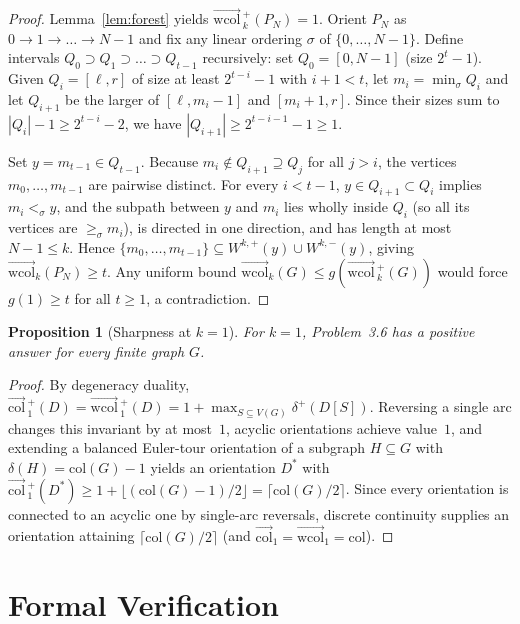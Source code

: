 \documentclass[11pt]{article}
\newtheorem{proposition}[theorem]{Proposition}
\newcommand{\wcol}{\overrightarrow{\mathrm{wcol}}}
\newcommand{\dcol}{\overrightarrow{\mathrm{col}}}
\newcommand{\wcolp}{\overrightarrow{\mathrm{wcol}}\,^{+}}
\newcommand{\dcolp}{\overrightarrow{\mathrm{col}}\,^{+}}
\begin{document}
\begin{proof}
Lemma~\ref{lem:forest} yields $\wcolp_k(P_N) = 1$. Orient $P_N$ as $0 \to 1 \to \dots \to N - 1$ and fix any linear ordering $\sigma$ of $\{0, \dots, N - 1\}$. Define intervals $Q_0 \supset Q_1 \supset \dots \supset Q_{t-1}$ recursively: set $Q_0 = [0, N - 1]$ (size $2^t - 1$). Given $Q_i = [\ell, r]$ of size at least $2^{t-i} - 1$ with $i + 1 < t$, let $m_i = \min_\sigma Q_i$ and let $Q_{i+1}$ be the larger of $[\ell, m_i - 1]$ and $[m_i + 1, r]$. Since their sizes sum to $|Q_i| - 1 \ge 2^{t-i} - 2$, we have $|Q_{i+1}| \ge 2^{t-i-1} - 1 \ge 1$.

Set $y = m_{t-1} \in Q_{t-1}$. Because $m_i \notin Q_{i+1} \supseteq Q_j$ for all $j > i$, the vertices $m_0, \dots, m_{t-1}$ are pairwise distinct. For every $i < t - 1$, $y \in Q_{i+1} \subset Q_i$ implies $m_i <_\sigma y$, and the subpath between $y$ and $m_i$ lies wholly inside $Q_i$ (so all its vertices are $\ge_\sigma m_i$), is directed in one direction, and has length at most $N - 1 \le k$. Hence $\{m_0, \dots, m_{t-1}\} \subseteq W^{k,+}(y) \cup W^{k,-}(y)$, giving $\wcol_k(P_N) \ge t$. Any uniform bound $\wcol_k(G) \le g(\wcolp_k(G))$ would force $g(1) \ge t$ for all $t \ge 1$, a contradiction.
\end{proof}

\begin{proposition}[Sharpness at $k = 1$]
For $k = 1$, Problem~3.6 has a positive answer for every finite graph $G$.
\end{proposition}

\begin{proof}
By degeneracy duality, $\dcolp_1(D) = \wcolp_1(D) = 1 + \max_{S \subseteq V(G)} \delta^+(D[S])$. Reversing a single arc changes this invariant by at most~$1$, acyclic orientations achieve value~$1$, and extending a balanced Euler-tour orientation of a subgraph $H \subseteq G$ with $\delta(H) = \mathrm{col}(G) - 1$ yields an orientation $D^*$ with $\dcolp_1(D^*) \ge 1 + \lfloor (\mathrm{col}(G) - 1)/2 \rfloor = \lceil \mathrm{col}(G)/2 \rceil$. Since every orientation is connected to an acyclic one by single-arc reversals, discrete continuity supplies an orientation attaining $\lceil \mathrm{col}(G)/2 \rceil$ (and $\dcol_1 = \wcol_1 = \mathrm{col}$).
\end{proof}

\section{Formal Verification}
\end{document}

